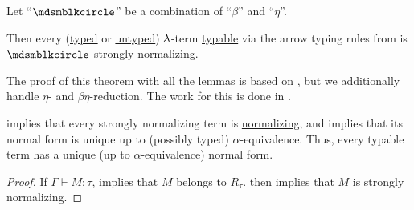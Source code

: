 \begin{theorem}\label{thm:simply_typable_terms_are_strongly_normalizing}
  Let \enquote{\( {\Anon} \)} be a combination of \enquote{\( \beta \)} and \enquote{\( \eta \)}.

  Then every (\hyperref[def:typed_lambda_term]{typed} or \hyperref[def:lambda_term]{untyped}) \( {\mathrm \lambda} \)-term \hyperref[def:typability]{typable} via the arrow typing rules from  is \hyperref[def:strongly_normalizing_lambda_term]{\( \Anon \)-strongly normalizing}.
\end{theorem}
\begin{comments}
  \item The proof of this theorem with all the lemmas is based on , but we additionally handle \( \eta \)- and \( \beta\eta \)-reduction. The work for this is done in .

  \item {} implies that every strongly normalizing term is \hyperref[def:lambda_term_normal_form]{normalizing}, and  implies that its normal form is unique up to (possibly typed) \( \alpha \)-equivalence. Thus, every typable term has a unique (up to \( \alpha \)-equivalence) normal form.
\end{comments}
\begin{proof}
  If \( \Gamma \vdash M: \tau \),  implies that \( M \) belongs to \( R_\tau \).  then implies that \( M \) is strongly normalizing.
\end{proof}
